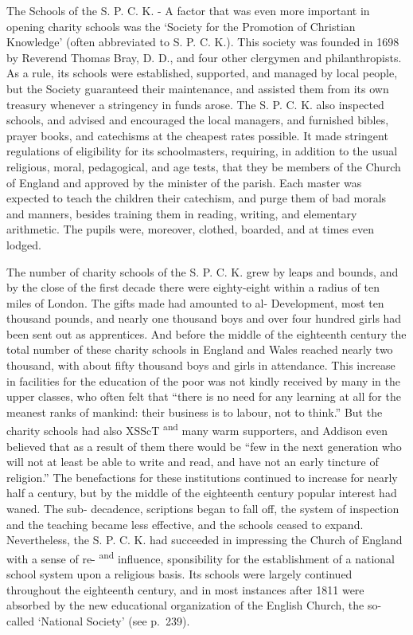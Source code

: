 \documentclass[
]{book}
\begin{document}
The Schools of the S. P. C. K. - A factor that was even more important in opening charity schools was the `Society for the Promotion of Christian Knowledge' (often abbreviated to S. P. C. K.). This society was founded in 1698 by Reverend Thomas Bray, D. D., and four other clergymen and philanthropists. As a rule, its schools were established, supported, and managed by local people, but the Society guaranteed their maintenance, and assisted them from its own treasury whenever a stringency in funds arose. The S. P. C. K. also inspected schools, and advised and encouraged the local managers, and furnished bibles, prayer books, and catechisms at the cheapest rates possible. It made stringent regulations of eligibility for its schoolmasters, requiring, in addition to the usual religious, moral, pedagogical, and age tests, that they be members of the Church of England and approved by the minister of the parish. Each master was expected to teach the children their catechism, and purge them of bad morals and manners, besides training them in reading, writing, and elementary arithmetic. The pupils were, moreover, clothed, boarded, and at times even lodged.

The number of charity schools of the S. P. C. K. grew by leaps and bounds, and by the close of the first decade there were eighty-eight within a radius of ten\protect\hypertarget{ch20.xmlux5cux23para.292.1.0.box.129.228.1263.1556.q.60}{}{ miles of London. The gifts made had amounted to al- Development, most ten thousand pounds, and nearly one thousand boys and over four hundred girls had been sent out as apprentices. And before the middle of the eighteenth century the total number of these charity schools in England and Wales reached nearly two thousand, with about fifty thousand boys and girls in attendance. This increase in facilities for the education of the poor was not kindly received by many in the upper classes, who often felt that ``there is no need for any learning at all for the meanest ranks of mankind: their business is to labour, not to think.'' But the charity schools had also XSScT \textsuperscript{and} many warm supporters, and Addison even believed that as a result of them there would be ``few in the next generation who will not at least be able to write and read, and have not an early tincture of religion.'' The benefactions for these institutions continued to increase for nearly half a century, but by the middle of the eighteenth century popular interest had waned. The sub- decadence, scriptions began to fall off, the system of inspection and the teaching became less effective, and the schools ceased to expand. Nevertheless, the S. P. C. K. had succeeded in impressing the Church of England with a sense of re- \textsuperscript{and} influence, sponsibility for the establishment of a national school system upon a religious basis. Its schools were largely continued throughout the eighteenth century, and in most instances after 1811 were absorbed by the new educational organization of the English Church, the so-called `National Society' (see p.~239).}
\end{document}
